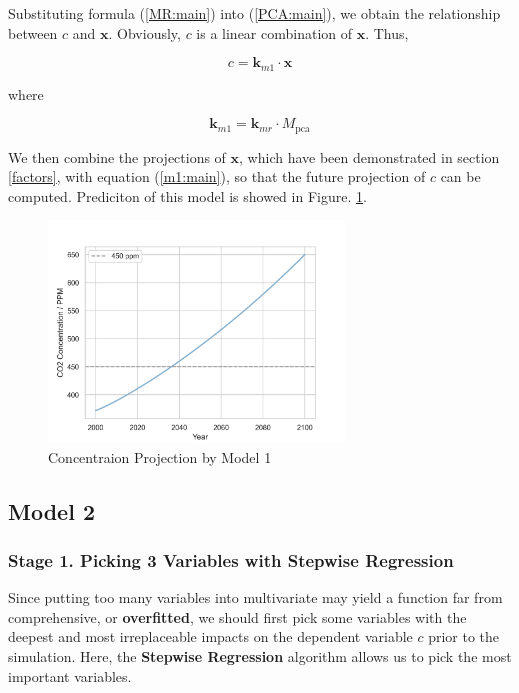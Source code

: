\documentclass[12pt]{article}
\begin{document}
Substituting formula (\ref{MR:main}) into (\ref{PCA:main}), we obtain the relationship between $c$ and $\boldsymbol{x}$. Obviously, $c$ is a linear combination of $\boldsymbol{x}$. Thus, 

\begin{equation}
    \label{m1:main}
    c = \boldsymbol{k}_{m1} \cdot \boldsymbol{x}
\end{equation}

where

\begin{equation}
    \boldsymbol{k}_{m1} = \boldsymbol{k}_{mr} \cdot M_{\text{pca}}
\end{equation}

We then combine the projections of $\boldsymbol{x}$, which have been demonstrated in section \ref{factors}, with equation (\ref{m1:main}), so that the future projection of $c$ can be computed. Prediciton of this model is showed in Figure. \ref{m1:fig}.

\begin{figure}[hbt]
    \centering
    \includegraphics[width = 0.7\textwidth]{fig/PCA.png}
    \caption{ Concentraion Projection by Model 1}
    \label{m1:fig}
\end{figure}

\subsection{Model 2}

\subsubsection{Stage 1. Picking 3 Variables with Stepwise Regression}

Since putting too many variables into multivariate may yield a function far from comprehensive, or \textbf{overfitted}, we should first pick some variables with the deepest and most irreplaceable impacts on the dependent variable $c$ prior to the simulation. Here, the \textbf{Stepwise Regression} algorithm allows us to pick the most important variables. 
\end{document}
